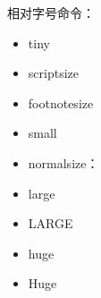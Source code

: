 

           
            相对字号命令：
            \begin{itemize}
                \item {\tiny tiny} 
                \item {\scriptsize scriptsize}
                \item {\footnotesize footnotesize}
                \item {\small small}
                \item {\normalsize normalsize}：\showfontsize
                \item {\large large}
                \item {\LARGE LARGE}
                \item {\huge huge}
                \item {\Huge Huge}
            \end{itemize}
        
